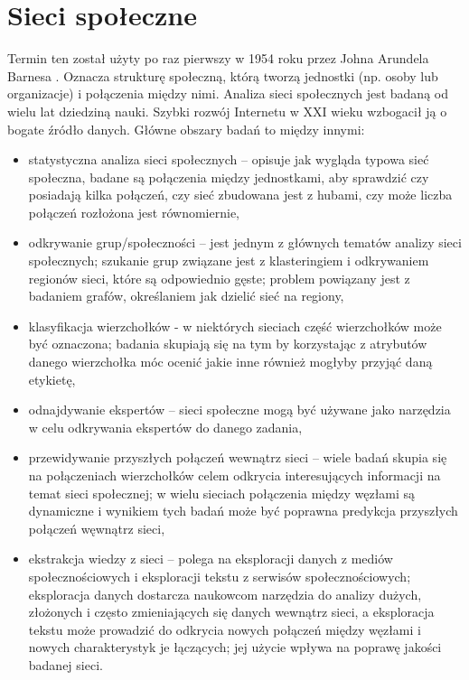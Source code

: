 \section{Sieci społeczne}
Termin ten został użyty po raz pierwszy w 1954 roku przez Johna Arundela Barnesa
\cite{JABarnes}. Oznacza strukturę społeczną, którą tworzą jednostki (np. osoby
lub organizacje) i połączenia między nimi.
Analiza sieci społecznych jest badaną od wielu lat dziedziną nauki. Szybki
rozwój Internetu w XXI wieku wzbogacił ją o bogate źródło danych. Główne obszary
badań \cite{SNDAtopics} to między innymi:
\begin{itemize}
  \item statystyczna analiza sieci społecznych -- opisuje jak wygląda typowa sieć społeczna,
  badane są połączenia między jednostkami, aby sprawdzić czy posiadają kilka połączeń,
  czy sieć zbudowana jest z hubami, czy może liczba połączeń rozłożona 
  jest równomiernie,
  \item odkrywanie grup/społeczności -- jest jednym z głównych tematów analizy 
  sieci społecznych; szukanie grup związane jest z klasteringiem i odkrywaniem 
  regionów sieci, które są odpowiednio gęste; problem powiązany jest z badaniem
  grafów, określaniem jak dzielić sieć na regiony,
  \item klasyfikacja wierzchołków - w niektórych sieciach część wierzchołków 
  może być oznaczona; badania skupiają się na tym by korzystając z atrybutów 
  danego wierzchołka móc ocenić jakie inne również mogłyby przyjąć daną etykietę,
  \item odnajdywanie ekspertów -- sieci społeczne mogą być używane jako narzędzia
  w celu odkrywania ekspertów do danego zadania,
  \item przewidywanie przyszłych połączeń wewnątrz sieci -- wiele badań skupia się
  na połączeniach wierzchołków celem odkrycia interesujących informacji na temat
  sieci społecznej; w wielu sieciach połączenia między węzłami są dynamiczne
  i wynikiem tych badań może być poprawna predykcja przyszłych połączeń
  węwnątrz sieci,
  \item ekstrakcja wiedzy z sieci -- polega na eksploracji danych z mediów 
  społecznościowych i eksploracji tekstu z serwisów społecznościowych; 
  eksploracja danych dostarcza naukowcom narzędzia do analizy dużych, 
  złożonych i często zmieniających się danych wewnątrz sieci, a eksploracja tekstu
  może prowadzić do odkrycia nowych połączeń między węzłami i nowych
  charakterystyk je łączących; jej użycie wpływa na poprawę jakości
  badanej sieci. 
\end{itemize}



